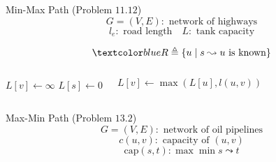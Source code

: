 \begin{frame}{}
  \begin{exampleblock}{Min-Max Path (Problem $11.12$)}
    \[
      G = (V, E): \text{ network of highways}
    \]
    \[
      l_e: \text{ road length} \quad L: \text{ tank capacity}
    \]
	  
    \vspace{0.30cm}
    \centerline{}
  \end{exampleblock}

  \pause
  \[
    \blue{R \triangleq \set{u \mid s \leadsto u \text{ is known}}}
  \]

  \pause
  \begin{columns}
      \begin{algorithmic}
	  \State $L[v] \gets \infty$
	\EndFor
	\State $L[s] \gets 0$
      \end{algorithmic}
      \begin{algorithmic}
	  \State $L[v] \gets \max(L[u], l(u,v))$
	\EndIf
      \end{algorithmic}
  \end{columns}
\end{frame}
\begin{frame}{}
  \begin{exampleblock}{Max-Min Path (Problem $13.2$)}
    \[
      G = (V, E): \text{ network of oil pipelines}
    \]
    \[
      c(u,v): \text{ capacity of } (u,v)
    \]
    \[
      \text{cap}(s,t): \max \min s \leadsto t
    \]
    
    \vspace{0.30cm}
    \centerline{}
  \end{exampleblock}

  \pause
\end{frame}

